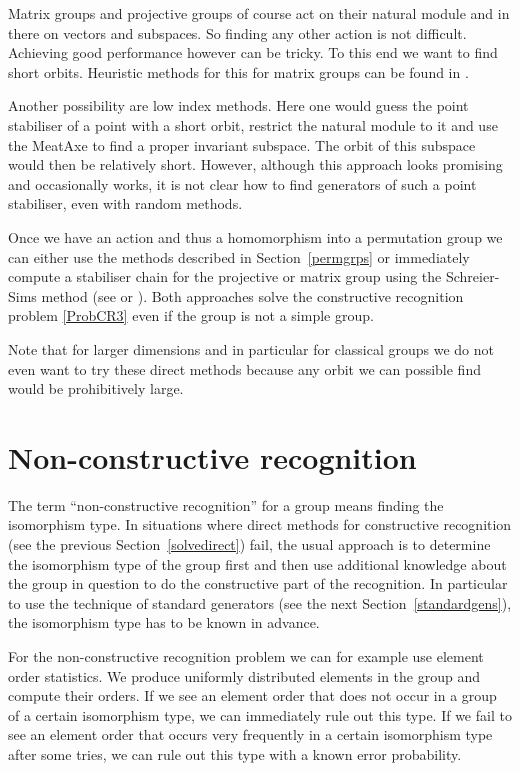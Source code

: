 Matrix groups and projective groups of course act on their natural
module and in there on vectors and subspaces. So finding any other
action is not difficult. Achieving good performance however can be
tricky. To this end we want to find short orbits. Heuristic methods
for this for matrix groups can be found in \cite{shortorbits}.

Another possibility are low index methods.
Here one would guess the point stabiliser of a point with a short
orbit, restrict the natural module to it and use the MeatAxe to find a
proper invariant subspace. The orbit of this subspace would then be
relatively short. However, although this approach looks promising and
occasionally works, it is not clear how to find generators of such a
point stabiliser, even with random methods.

Once we have an action and thus a homomorphism into a permutation 
group we can either use the methods described in Section~\ref{permgrps}
or immediately compute a stabiliser chain for the projective or matrix
group using the Schreier-Sims method (see \cite{nearlylin} or
\cite{Ser}). Both approaches solve the constructive recognition
problem \ref{ProbCR3} even if the group is not a simple group.

Note that for larger dimensions and in particular for classical groups
we do not even want to try these direct methods because any orbit we
can possible find would be prohibitively large.


\section{Non-constructive recognition}
\label{nonconstructive}

The term ``non-constructive recognition'' for a group means finding
the isomorphism type. In situations where direct methods for constructive 
recognition (see the previous Section~\ref{solvedirect}) fail, the usual
approach is to determine the isomorphism type of the group first and
then use additional knowledge about the group in question to do the
constructive part of the recognition. In particular to use the
technique of standard generators (see the next
Section~\ref{standardgens}), the isomorphism type has to be known in
advance.

For the non-constructive recognition problem we can for example use
element order statistics. We produce uniformly distributed elements in
the group and compute their orders. If we see an element order that
does not occur in a group of a certain isomorphism type, we can
immediately rule out this type. If we fail to see an element order that
occurs very frequently in a certain isomorphism type after some tries,
we can rule out this type with a known error probability.


